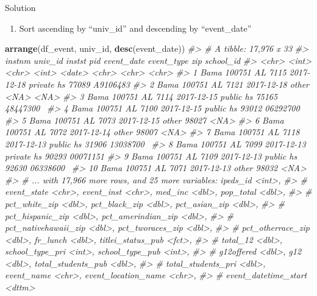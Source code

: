 \documentclass[8pt,ignorenonframetext,dvipsnames]{beamer}
\newenvironment{Shaded}{\begin{snugshade}}{\end{snugshade}}
\newcommand{\KeywordTok}[1]{\textcolor[rgb]{0.13,0.29,0.53}{\textbf{#1}}}
\newcommand{\CommentTok}[1]{\textcolor[rgb]{0.56,0.35,0.01}{\textit{#1}}}
\newcommand{\NormalTok}[1]{#1}
\providecommand{\tightlist}{%
  \setlength{\itemsep}{0pt}\setlength{\parskip}{0pt}}
\renewcommand{\textbf}[1]{{\color{darkgray}\bfseries\fontfamily{Montserrat-TOsF}#1}}
\let\olditem\item
\renewcommand{\item}{%
  \olditem\vspace{4pt}
}
\begin{document}
\begin{frame}[fragile]{Solution}

\begin{enumerate}
\def\labelenumi{\arabic{enumi}.}
\tightlist
\item
  Sort ascending by ``univ\_id'' and descending by ``event\_date''
\end{enumerate}

\begin{Shaded}
\begin{Highlighting}[]
\KeywordTok{arrange}\NormalTok{(df_event, univ_id, }\KeywordTok{desc}\NormalTok{(event_date))}
\CommentTok{#> # A tibble: 17,976 x 33}
\CommentTok{#>    instnm univ_id instst   pid event_date event_type zip   school_id}
\CommentTok{#>    <chr>    <int> <chr>  <int> <date>     <chr>      <chr> <chr>    }
\CommentTok{#>  1 Bama    100751 AL      7115 2017-12-18 private hs 77089 A9106483 }
\CommentTok{#>  2 Bama    100751 AL      7121 2017-12-18 other      <NA>  <NA>     }
\CommentTok{#>  3 Bama    100751 AL      7114 2017-12-15 public hs  75165 48447300~}
\CommentTok{#>  4 Bama    100751 AL      7100 2017-12-15 public hs  93012 06292700~}
\CommentTok{#>  5 Bama    100751 AL      7073 2017-12-15 other      98027 <NA>     }
\CommentTok{#>  6 Bama    100751 AL      7072 2017-12-14 other      98007 <NA>     }
\CommentTok{#>  7 Bama    100751 AL      7118 2017-12-13 public hs  31906 13038700~}
\CommentTok{#>  8 Bama    100751 AL      7099 2017-12-13 private hs 90293 00071151 }
\CommentTok{#>  9 Bama    100751 AL      7109 2017-12-13 public hs  92630 06338600~}
\CommentTok{#> 10 Bama    100751 AL      7071 2017-12-13 other      98032 <NA>     }
\CommentTok{#> # ... with 17,966 more rows, and 25 more variables: ipeds_id <int>,}
\CommentTok{#> #   event_state <chr>, event_inst <chr>, med_inc <dbl>, pop_total <dbl>,}
\CommentTok{#> #   pct_white_zip <dbl>, pct_black_zip <dbl>, pct_asian_zip <dbl>,}
\CommentTok{#> #   pct_hispanic_zip <dbl>, pct_amerindian_zip <dbl>,}
\CommentTok{#> #   pct_nativehawaii_zip <dbl>, pct_tworaces_zip <dbl>,}
\CommentTok{#> #   pct_otherrace_zip <dbl>, fr_lunch <dbl>, titlei_status_pub <fct>,}
\CommentTok{#> #   total_12 <dbl>, school_type_pri <int>, school_type_pub <int>,}
\CommentTok{#> #   g12offered <dbl>, g12 <dbl>, total_students_pub <dbl>,}
\CommentTok{#> #   total_students_pri <dbl>, event_name <chr>, event_location_name <chr>,}
\CommentTok{#> #   event_datetime_start <dttm>}
\end{Highlighting}
\end{Shaded}

\end{frame}
\end{document}
